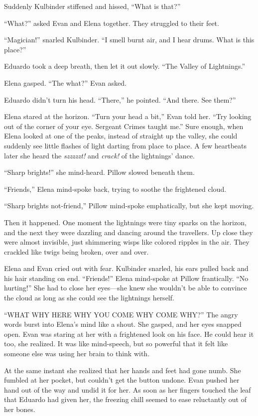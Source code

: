 \documentclass[10pt]{book}
\begin{document}
Suddenly Kulbinder stiffened and hissed, ``What is that?''

``What?'' asked Evan and Elena together. They struggled to their feet.

``Magician!'' snarled Kulbinder. ``I smell burnt air, and I hear drums. What is this place?''

Eduardo took a deep breath, then let it out slowly. ``The Valley of Lightnings.''

Elena gasped. ``The what?'' Evan asked.

Eduardo didn't turn his head. ``There,'' he pointed. ``And there. See them?''

Elena stared at the horizon. ``Turn your head a bit,'' Evan told her. ``Try looking out of the corner of your eye. Sergeant Crimes taught me.'' Sure enough, when Elena looked at one of the peaks, instead of straight up the valley, she could suddenly see little flashes of light darting from place to place. A few heartbeats later she heard the \emph{szzzzzt!} and \emph{crack!} of the lightnings' dance.

``Sharp brights!'' she mind-heard. Pillow slowed beneath them.

``Friends,'' Elena mind-spoke back, trying to soothe the frightened cloud.

``Sharp brights not-friend,'' Pillow mind-spoke emphatically, but she kept moving.

Then it happened. One moment the lightnings were tiny sparks on the horizon, and the next they were dazzling and dancing around the travellers. Up close they were almost invisible, just shimmering wisps like colored ripples in the air. They crackled like twigs being broken, over and over.

Elena and Evan cried out with fear. Kulbinder snarled, his ears pulled back and his hair standing on end. ``Friends!'' Elena mind-spoke at Pillow frantically. ``No hurting!'' She had to close her eyes---she knew she wouldn't be able to convince the cloud as long as she could see the lightnings herself.

``WHAT WHY HERE WHY YOU COME WHY COME WHY?'' The angry words burst into Elena's mind like a shout. She gasped, and her eyes snapped open. Evan was staring at her with a frightened look on his face. He could hear it too, she realized. It was like mind-speech, but so powerful that it felt like someone else was using her brain to think with.

At the same instant she realized that her hands and feet had gone numb. She fumbled at her pocket, but couldn't get the button undone. Evan pushed her hand out of the way and undid it for her. As soon as her fingers touched the leaf that Eduardo had given her, the freezing chill seemed to ease reluctantly out of her bones.
\end{document}
